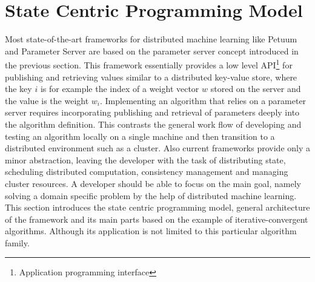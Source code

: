 
\chapter{State Centric Programming Model}
\label{c:state_centric}
Most state-of-the-art frameworks for distributed machine learning like Petuum \cite{Xing2015} and Parameter Server \cite{Li2014} are based on the parameter server concept introduced in the previous section.
This framework essentially provides a low level API\footnote{Application programming interface} for publishing and retrieving values similar to a distributed key-value store, where the key $i$ is for example the index of a weight vector $w$ stored on the server and the value is the weight $w_i$.
Implementing an algorithm that relies on a parameter server requires incorporating publishing and retrieval of parameters deeply into the algorithm definition.
This contrasts the general work flow of developing and testing an algorithm locally on a single machine and then transition to a distributed environment such as a cluster.
Also current frameworks provide only a minor abstraction, leaving the developer with the task of distributing state, scheduling distributed computation, consistency management and managing cluster resources.
A developer should be able to focus on the main goal, namely solving a domain specific problem by the help of distributed machine learning.
This section introduces the state centric programming model, general architecture of the framework and its main parts based on the example of iterative-convergent algorithms.
Although its application is not limited to this particular algorithm family.

